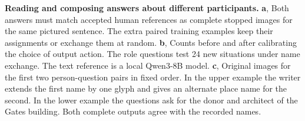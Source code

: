 \textbf{Reading and composing answers about different participants.}
\textbf{a}, Both answers must match accepted human references as complete stopped images for the same pictured sentence. The extra paired training examples keep their assignments or exchange them at random.
\textbf{b}, Counts before and after calibrating the choice of output action. The role questions test 24 new situations under name exchange. The text reference is a local Qwen3-8B model.
\textbf{c}, Original images for the first two person-question pairs in fixed order. In the upper example the writer extends the first name by one glyph and gives an alternate place name for the second. In the lower example the questions ask for the donor and architect of the Gates building. Both complete outputs agree with the recorded names.
